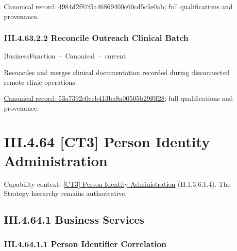 {\footnotesize \href{../../../../continuum/business/business-function/4984d2f87f5a46869400c60cd5c5e0ab.md}{Canonical record: 4984d2f87f5a46869400c60cd5c5e0ab}; full qualifications and provenance.}\par
\subsubsection*{III.4.63.2.2 Reconcile Outreach Clinical Batch}
\label{navigation:III.4.63.2.2}

\label{element:53a7392c0ceb413ba8a00505b29f0f28}
{\small BusinessFunction · Canonical · current}\par

Reconciles and merges clinical documentation recorded during disconnected remote clinic operations.


{\footnotesize \href{../../../../continuum/business/business-function/53a7392c0ceb413ba8a00505b29f0f28.md}{Canonical record: 53a7392c0ceb413ba8a00505b29f0f28}; full qualifications and provenance.}\par
\section*{III.4.64 [CT3] Person Identity Administration}
\label{navigation:III.4.64}

{\small Capability context: \hyperref[element:6c3de7750ef1436cad6a9533731782b6]{[CT3] Person Identity Administration} (II.1.3.6.1.4). The Strategy hierarchy remains authoritative.}\par
\subsection*{III.4.64.1 Business Services}
\label{navigation:III.4.64.1}

\subsubsection*{III.4.64.1.1 Person Identifier Correlation}
\label{navigation:III.4.64.1.1}

